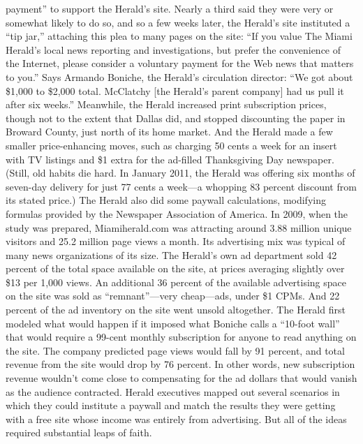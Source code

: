 payment'' to support the Herald's site. Nearly a third said they were very or
somewhat likely to do so, and so a few weeks later, the Herald's site instituted a
``tip jar,'' attaching this plea to many pages on the site: ``If you value The Miami
Herald's local news reporting and investigations, but prefer the convenience of
the Internet, please consider a voluntary payment for the Web news that matters
to you.'' Says Armando Boniche, the Herald's circulation director: ``We got about
\$1,000 to \$2,000 total. McClatchy [the Herald's parent company] had us pull it
after six weeks.''
Meanwhile, the Herald increased print subscription prices, though not to the
extent that Dallas did, and stopped discounting the paper in Broward County, just
north of its home market. And the Herald made a few smaller price-enhancing
moves, such as charging 50 cents a week for an insert with TV listings and \$1
extra for the ad-filled Thanksgiving Day newspaper. (Still, old habits die hard. In
January 2011, the Herald was offering six months of seven-day delivery for just
77 cents a week—a whopping 83 percent discount from its stated price.)
The Herald also did some paywall calculations, modifying formulas provided
by the Newspaper Association of America. In 2009, when the study was prepared,
Miamiherald.com was attracting around 3.88 million unique visitors and
25.2 million page views a month. Its advertising mix was typical of many news
organizations of its size. The Herald's own ad department sold 42 percent of the
total space available on the site, at prices averaging slightly over \$13 per 1,000
views. An additional 36 percent of the available advertising space on the site was
sold as ``remnant''—very cheap—ads, under \$1 CPMs. And 22 percent of the ad
inventory on the site went unsold altogether.
The Herald first modeled what would happen if it imposed what Boniche calls
a ``10-foot wall'' that would require a 99-cent monthly subscription for anyone
to read anything on the site. The company predicted page views would fall by
91 percent, and total revenue from the site would drop by 76 percent. In other
words, new subscription revenue wouldn't come close to compensating for the
ad dollars that would vanish as the audience contracted.
Herald executives mapped out several scenarios in which they could institute
a paywall and match the results they were getting with a free site whose
income was entirely from advertising. But all of the ideas required substantial
leaps of faith.
